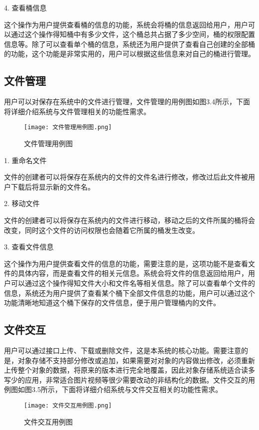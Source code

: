 4. 查看桶信息

这个操作为用户提供查看桶的信息的功能，系统会将桶的信息返回给用户，用户可以通过这个操作得知桶中有多少文件，这个桶总共占据了多少空间，桶的权限配置信息等。除了可以查看单个桶的信息，系统还为用户提供了查看自己创建的全部桶的功能，这个功能是非常实用的，用户可以根据这些信息来对自己的桶进行管理。

\subsection{文件管理}
用户可以对保存在系统中的文件进行管理，文件管理的用例图如图3.4所示，下面将详细介绍系统与文件管理相关的功能性需求。

\begin{figure}[h]
    \centering
    \texttt{[image: 文件管理用例图.png]}
    \caption{文件管理用例图}
\end{figure}

1. 重命名文件

文件的创建者可以将保存在系统内的文件的文件名进行修改，修改过后此文件被用户下载后将显示新的文件名。

2. 移动文件

文件的创建者可以将保存在系统内的文件进行移动，移动之后的文件所属的桶将会改变，同时这个文件的访问权限也会随着它所属的桶发生改变。

3. 查看文件信息

这个操作为用户提供查看文件的信息的功能，需要注意的是，这项功能不是查看文件的具体内容，而是查看文件的相关元信息。系统会将文件的信息返回给用户，用户可以通过这个操作得知文件大小和文件名等相关信息。除了可以查看单个文件的信息，系统还为用户提供了查看某个桶下全部文件信息的功能，用户可以通过这个功能清晰地知道这个桶下保存的文件信息，便于用户管理桶内的文件。

\subsection{文件交互}
用户可以通过接口上传、下载或删除文件，这是本系统的核心功能。需要注意的是，对象存储不支持部分修改或追加，如果需要对对象的内容做出修改，必须重新上传整个对象的数据，将原来的版本进行完全地覆盖，因此对象存储系统适合读多写少的应用，非常适合图片视频等很少需要改动的非结构化的数据。文件交互的用例图如图3.5所示，下面将详细介绍系统与文件交互相关的功能性需求。

\begin{figure}[h]
    \centering
    \texttt{[image: 文件交互用例图.png]}
    \caption{文件交互用例图}
\end{figure}

